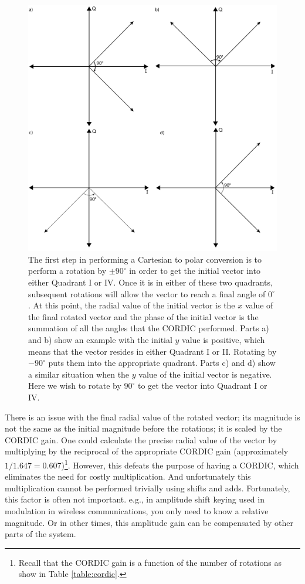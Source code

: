 \begin{figure}
\centering
\includegraphics[width=\textwidth]{images/cordic_magnitude_angle}
\caption{The first step in performing a Cartesian to polar conversion is to perform a rotation by $\pm 90^{\circ}$ in order to get the initial vector into either Quadrant I or IV. Once it is in either of these two quadrants, subsequent rotations will allow the vector to reach a final angle of $0^{\circ}$. At this point, the radial value of the initial vector is the $x$ value of the final rotated vector and the phase of the initial vector is the summation of all the angles that the CORDIC performed. Parts a) and b) show an example with the initial $y$ value is positive, which means that the vector resides in either Quadrant I or II. Rotating by $-90^{\circ}$ puts them into the appropriate quadrant. Parts c) and d) show a similar situation when the $y$ value of the initial vector is negative. Here we wish to rotate by $90^{\circ}$ to get the vector into Quadrant I or IV. }
\label{fig:rotate90}
\end{figure}

There is an issue with the final radial value of the rotated vector; its magnitude is not the same as the initial magnitude before the rotations; it is scaled by the CORDIC gain. One could calculate the precise radial value of the vector by multiplying by the reciprocal of the appropriate CORDIC gain (approximately $1/1.647 = 0.607$)\footnote{Recall that the CORDIC gain is a function of the number of rotations as show in Table \ref{table:cordic}.}. However, this defeats the purpose of having a CORDIC, which eliminates the need for costly multiplication. And unfortunately this multiplication cannot be performed trivially using shifts and adds. Fortunately, this factor is often not important. e.g., in amplitude shift keying used in modulation in wireless communications, you only need to know a relative magnitude.  Or in other times, this amplitude gain can be compensated by other parts of the system.

